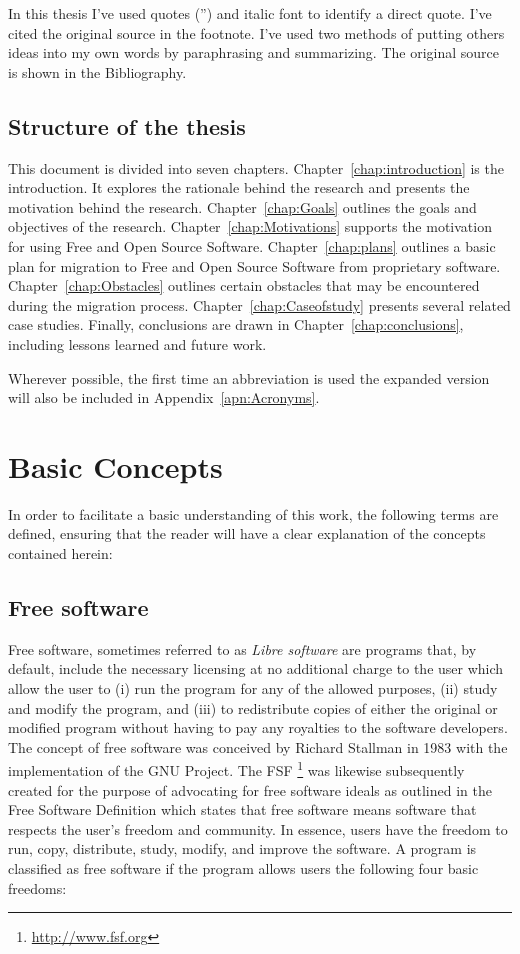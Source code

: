 In this thesis I've used quotes ('') and italic font to identify a direct quote. I've cited the original source in the footnote. I've used two methods of putting others ideas into my own words by paraphrasing and summarizing. The original source is shown in the Bibliography.

\subsection{Structure of the thesis}

This document is divided into seven chapters. Chapter~\ref{chap:introduction} is the introduction. It explores the rationale behind the research and presents the motivation behind the research. Chapter~\ref{chap:Goals}  outlines the goals and objectives of the research. Chapter~\ref{chap:Motivations} supports the motivation for using Free and Open Source Software. Chapter~\ref{chap:plans} outlines a basic plan for migration to Free and Open Source Software from proprietary software.  Chapter~\ref{chap:Obstacles} outlines certain obstacles that may be encountered during the migration process. Chapter~\ref{chap:Caseofstudy}  presents several related case studies. Finally, conclusions are drawn in Chapter~\ref{chap:conclusions}, including lessons learned and future work.

 Wherever possible, the first time an abbreviation is used the expanded version will also be included in Appendix~\ref{apn:Acronyms}.
 
 \section{Basic Concepts }

In order to facilitate a basic understanding of this work, the following terms are defined, ensuring that the reader will have a clear explanation of the concepts contained herein:
 
 \subsection{Free software}
 \label{sec:freeopen}
Free software, sometimes referred to as \emph{Libre software} are programs that, by default, include the necessary licensing at no additional charge to the user which allow the user to
 (i) run the program for any of the allowed purposes, (ii) study and modify the program, and (iii) to redistribute copies of either the original or modified program without having to pay any royalties to the software developers. The concept of free software was conceived by Richard Stallman in 1983 with the implementation of the \ac{GNU} Project. The \ac{FSF} \footnote{\url{http://www.fsf.org}}  was likewise subsequently created for the purpose of advocating for free software ideals as outlined in the Free Software Definition which states that free software means software that respects the user’s freedom and community. In essence, users have the freedom to run, copy, distribute, study, modify, and improve the software. A program is classified as free software if the program allows users the following four basic freedoms:

